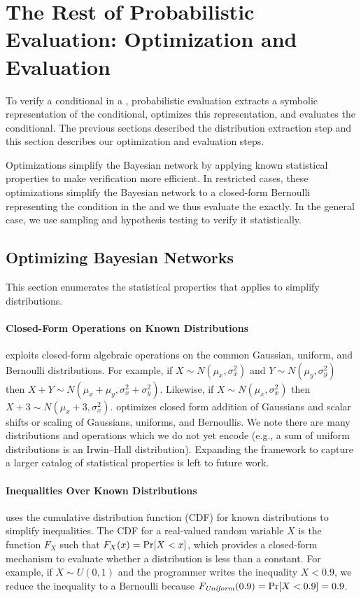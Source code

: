 \section{The Rest of Probabilistic Evaluation: Optimization and
  Evaluation}
\label{sec:mechanisms}

To verify a conditional in a \passert, probabilistic evaluation
extracts a symbolic representation of the conditional, optimizes this
representation, and evaluates the conditional.  The previous sections
described the distribution extraction step and this section describes our
optimization and evaluation steps. 

Optimizations simplify the Bayesian network by applying known
statistical properties to make verification more efficient. In
restricted cases, these optimizations simplify the Bayesian network to a
closed-form Bernoulli representing the condition in the \passert and we thus
evaluate the \passert exactly. In the general case, we use sampling
and hypothesis testing to verify it statistically.

\subsection{Optimizing Bayesian Networks}
\label{sec:optim}

This section enumerates the statistical
properties that \tool applies to simplify distributions.

\paragraph{Closed-Form Operations on Known Distributions}
\tool exploits closed-form algebraic operations on the common
Gaussian, uniform, and Bernoulli distributions.
For example, if $X \sim N(\mu_x, \sigma^2_x)$ and $Y \sim N(\mu_y,
\sigma^2_y)$ then $X + Y \sim N(\mu_x + \mu_y, \sigma^2_x +
\sigma^2_y)$.  Likewise, if $X \sim N(\mu_x, \sigma^2_x)$ then $X + 3
\sim N(\mu_x + 3, \sigma^2_x)$.  \tool optimizes closed form addition
of Gaussians and scalar shifts or scaling of Gaussians, uniforms, and
Bernoullis.  We note there are many distributions and operations which
we do not yet encode (e.g., a sum of uniform distributions is
an Irwin--Hall distribution).
Expanding the framework to capture a larger catalog of statistical properties is left
to future work.

\paragraph{Inequalities Over Known Distributions} \tool uses the
cumulative distribution function (CDF) for known distributions to
simplify inequalities.  The CDF for a real-valued random variable $X$ is
the function $F_X$ such that $F_X(x) = \Pr\!\left[X < x\right]$, which provides a
closed-form mechanism to evaluate whether a distribution is less than
a constant.  For example, if $X \sim U(0,1)$ and the programmer writes
the inequality $X < 0.9$, we reduce the inequality
to a Bernoulli because $F_{\mathit{Uniform}}(0.9) = \Pr\!\left[X < 0.9\right] = 0.9$.  

